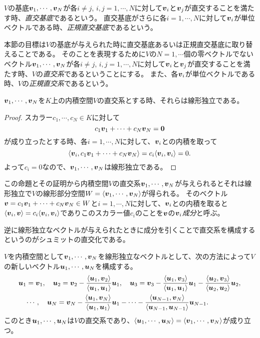 $V$の基底$\vb*{v}_1, \cdots, \vb*{v}_N$が各$i \ne j$, $i, j = 1, \cdots, N$に対して$\vb*{v}_i$と$\vb*{v}_j$が直交することを満たす時、\emph{直交基底}であるという。
直交基底がさらに各$i = 1, \cdots, N$に対して$\vb*{v}_i$が単位ベクトルである時、\emph{正規直交基底}であるという。

本節の目標は$V$の基底が与えられた時に直交基底あるいは正規直交基底に取り替えることである。
そのことを表現するために$V$の$N = 1, \cdots$個の零ベクトルでないベクトル$\vb*{v}_1, \cdots, \vb*{v}_N$が各$i \ne j$, $i, j = 1, \cdots, N$に対して$\vb*{v}_i$と$\vb*{v}_j$が直交することを満たす時、$V$の\emph{直交系}であるということにする。
また、各$\vb*{v}_i$が単位ベクトルである時、$V$の\emph{正規直交系}であるという。

\begin{proposition}[直交系と線形独立]
$\vb*{v}_1, \cdots, \vb*{v}_N$を$K$上の内積空間$V$の直交系とする時、それらは線形独立である。
\end{proposition}

\begin{proof}
スカラー$c_1, \cdots, c_N \in K$に対して
$$
c_1\vb*{v}_1+\cdots+c_N\vb*{v}_N = \vb*{0}
$$
が成り立ったとする時、各$i = 1, \cdots, N$に対して、$\vb*{v}_i$との内積を取って
$$
\langle\vb*{v}_i, c_1\vb*{v}_1+\cdots+c_N\vb*{v}_N\rangle = c_i\langle\vb*{v}_i, \vb*{v}_i\rangle = 0.
$$
よって$c_i = 0$なので、$\vb*{v}_1, \cdots, \vb*{v}_N$は線形独立である。
\end{proof}

この命題とその証明から内積空間$V$の直交系$\vb*{v}_1, \cdots, \vb*{v}_N$が与えられるとそれは線形独立で$V$の線形部分空間$W = \langle\vb*{v}_1, \cdots, \vb*{v}_N\rangle$が得られる。
そのベクトル$\vb*{v} = c_1\vb*{v}_1+\cdots+c_N\vb*{v}_N \in W$と$i = 1, \cdots, N$に対して、$\vb*{v}_i$との内積を取ると$\langle\vb*{v}_i, \vb*{v}\rangle = c_i\langle\vb*{v}_i, \vb*{v}_i\rangle$でありこのスカラー値$c_i$のことを$\vb*{v}$の$\vb*{v}_i$\emph{成分}と呼ぶ。

逆に線形独立なベクトルが与えられたときに成分を引くことで直交系を構成するというのがシュミットの直交化である。

\begin{theorem}[シュミットの直交化]
$V$を内積空間として$\vb*{v}_1, \cdots, \vb*{v}_N$を線形独立なベクトルとして、次の方法によって$V$の新しいベクトル$\vb*{u}_1, \cdots, \vb*{u}_N$を構成する。
$$
\begin{aligned}
&\vb*{u}_1 = \vb*{v}_1,
\quad
\vb*{u}_2 = \vb*{v}_2-\frac{\langle\vb*{u}_1, \vb*{v}_2\rangle}{\langle\vb*{u}_1, \vb*{u}_1\rangle}\vb*{u}_1,
\quad
\vb*{u}_3 = \vb*{v}_3-\frac{\langle\vb*{u}_1, \vb*{v}_3\rangle}{\langle\vb*{u}_1, \vb*{u}_1\rangle}\vb*{u}_1-\frac{\langle\vb*{u}_2, \vb*{v}_3\rangle}{\langle\vb*{u}_2, \vb*{u}_2\rangle}\vb*{u}_2, \\
&\quad \cdots,
\quad
\vb*{u}_N = \vb*{v}_N-\frac{\langle\vb*{u}_1, \vb*{v}_N\rangle}{\langle\vb*{u}_1, \vb*{u}_1\rangle}\vb*{u}_1-\cdots-\frac{\langle\vb*{u}_{N-1}, \vb*{v}_N\rangle}{\langle\vb*{u}_{N-1}, \vb*{u}_{N-1}\rangle}\vb*{u}_{N-1}.
\end{aligned}
$$
このとき$\vb*{u}_1, \cdots, \vb*{u}_N$は$V$の直交系であり、$\langle\vb*{u}_1, \cdots, \vb*{u}_N\rangle = \langle\vb*{v}_1, \cdots, \vb*{v}_N\rangle$が成り立つ。
\end{theorem}


